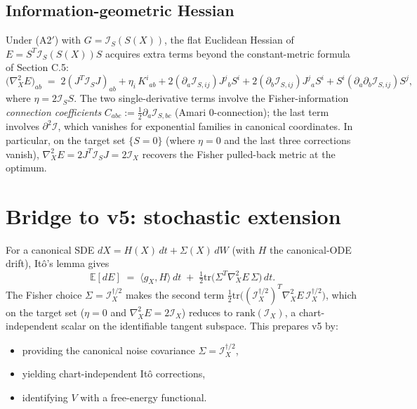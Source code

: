 \documentclass[11pt,oneside]{amsart}
\def\S{Section }%
\theoremstyle{plain}
\theoremstyle{definition}
\newcommand{\gX}{g_X}
\begin{document}
\subsection{Information-geometric Hessian}

Under \textup{(A2$'$)} with $G=\mathcal{I}_{S}(S(X))$, the flat Euclidean
Hessian of $E=S^{T}\mathcal{I}_{S}(S(X))S$ acquires extra terms beyond the
constant-metric formula of \S C.5:
\[
  \bigl(\nabla^{2}_{X}E\bigr)_{ab}
  \;=\; 2(J^{T}\mathcal{I}_{S}J)_{ab}
     + \eta_{i}\,K^{i}{}_{ab}
     + 2(\partial_{a}\mathcal{I}_{S,ij})J^{j}{}_{b}S^{i}
     + 2(\partial_{b}\mathcal{I}_{S,ij})J^{j}{}_{a}S^{i}
     + S^{i}(\partial_{a}\partial_{b}\mathcal{I}_{S,ij})S^{j},
\]
where $\eta = 2\mathcal{I}_{S}S$. The two single-derivative terms involve
the Fisher-information \emph{connection coefficients}
$C_{abc} := \tfrac{1}{2}\partial_{a}\mathcal{I}_{S,bc}$ (Amari
$0$-connection); the last term involves $\partial^{2}\mathcal{I}$,
which vanishes for exponential families in canonical coordinates.
In particular, on the target set $\{S=0\}$ (where $\eta=0$ and the
last three corrections vanish), $\nabla^{2}_{X}E = 2 J^{T}\mathcal{I}_{S}J=2\mathcal{I}_{X}$
recovers the Fisher pulled-back metric at the optimum.

\section{Bridge to v5: stochastic extension}
\label{sec:bridge-v5}

For a canonical SDE $dX = H(X)\,dt + \Sigma(X)\,dW$ (with
$H$ the canonical-ODE drift), It\^o's lemma gives
\[
  \mathbb{E}[dE] \;=\; \bigl\langle\gX,H\bigr\rangle\,dt
         \;+\; \tfrac{1}{2}\mathrm{tr}\!\bigl(\Sigma^{T}\nabla^{2}_{X}E\,\Sigma\bigr)\,dt.
\]
The Fisher choice $\Sigma = \mathcal{I}_{X}^{\dagger/2}$ makes the
second term
$\tfrac{1}{2}\mathrm{tr}\bigl((\mathcal{I}_{X}^{\dagger/2})^{T}\nabla^{2}_{X}E\,\mathcal{I}_{X}^{\dagger/2}\bigr)$,
which on the target set ($\eta=0$ and $\nabla^{2}_{X}E=2\mathcal{I}_{X}$)
reduces to $\mathrm{rank}(\mathcal{I}_{X})$, a chart-independent
scalar on the identifiable tangent subspace. This prepares v5 by:
\begin{itemize}[leftmargin=1.8em,nosep]
  \item providing the canonical noise covariance $\Sigma=\mathcal{I}_{X}^{\dagger/2}$,
  \item yielding chart-independent It\^o corrections,
  \item identifying $V$ with a free-energy functional.
\end{itemize}
\end{document}
